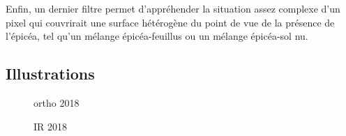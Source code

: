 \documentclass[a4paper, 12pt]{article} %
\begin{document}
Enfin, un dernier filtre permet d'appréhender la situation assez complexe d'un pixel qui couvrirait une surface hétérogène du point de vue de la présence de l'épicéa, tel qu'un mélange épicéa-feuillus ou un mélange épicéa-sol nu.

\subsection{Illustrations}

\begin{figure}
	\begin{minipage}[b]{.32\linewidth}
		\centering ortho 2018
	\end{minipage}%
	\begin{minipage}[b]{.32\linewidth}
		\centering IR 2018

\end{minipage}
\end{figure}
\end{document}
